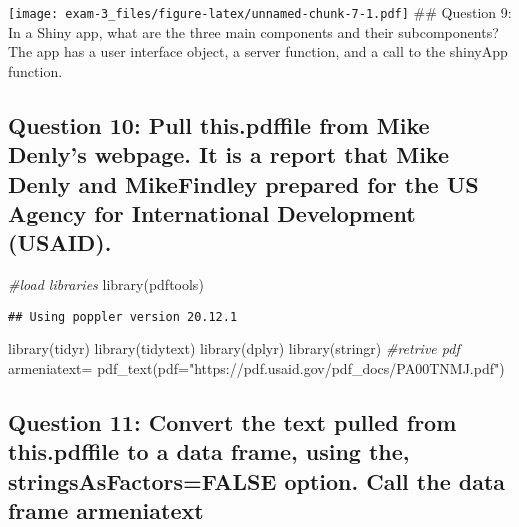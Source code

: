\documentclass[
]{article}
\newenvironment{Shaded}{\begin{snugshade}}{\end{snugshade}}
\newcommand{\AttributeTok}[1]{\textcolor[rgb]{0.77,0.63,0.00}{#1}}
\newcommand{\CommentTok}[1]{\textcolor[rgb]{0.56,0.35,0.01}{\textit{#1}}}
\newcommand{\FunctionTok}[1]{\textcolor[rgb]{0.00,0.00,0.00}{#1}}
\newcommand{\NormalTok}[1]{#1}
\newcommand{\OtherTok}[1]{\textcolor[rgb]{0.56,0.35,0.01}{#1}}
\newcommand{\StringTok}[1]{\textcolor[rgb]{0.31,0.60,0.02}{#1}}
\begin{document}
\texttt{[image: exam-3\_files/figure-latex/unnamed-chunk-7-1.pdf]} \#\#
Question 9: In a Shiny app, what are the three main components and their
subcomponents? The app has a user interface object, a server function,
and a call to the shinyApp function.

\hypertarget{question-10-pull-this.pdffile-from-mike-denlys-webpage.-it-is-a-report-that-mike-denly-and-mikefindley-prepared-for-the-us-agency-for-international-development-usaid.}{%
\subsection{Question 10: Pull this.pdffile from Mike Denly's webpage. It
is a report that Mike Denly and MikeFindley prepared for the US Agency
for International Development
(USAID).}\label{question-10-pull-this.pdffile-from-mike-denlys-webpage.-it-is-a-report-that-mike-denly-and-mikefindley-prepared-for-the-us-agency-for-international-development-usaid.}}

\begin{Shaded}
\begin{Highlighting}[]
\CommentTok{\#load libraries}
\FunctionTok{library}\NormalTok{(pdftools)}
\end{Highlighting}
\end{Shaded}

\begin{verbatim}
## Using poppler version 20.12.1
\end{verbatim}

\begin{Shaded}
\begin{Highlighting}[]
\FunctionTok{library}\NormalTok{(tidyr)}
\FunctionTok{library}\NormalTok{(tidytext)}
\FunctionTok{library}\NormalTok{(dplyr)}
\FunctionTok{library}\NormalTok{(stringr)}
\CommentTok{\#retrive pdf}
\NormalTok{armeniatext}\OtherTok{=} \FunctionTok{pdf\_text}\NormalTok{(}\AttributeTok{pdf=}\StringTok{"https://pdf.usaid.gov/pdf\_docs/PA00TNMJ.pdf"}\NormalTok{)}
\end{Highlighting}
\end{Shaded}

\hypertarget{question-11-convert-the-text-pulled-from-this.pdffile-to-a-data-frame-using-the-stringsasfactorsfalse-option.-call-the-data-frame-armeniatext}{%
\subsection{Question 11: Convert the text pulled from this.pdffile to a
data frame, using the, stringsAsFactors=FALSE option. Call the data
frame
armeniatext}\label{question-11-convert-the-text-pulled-from-this.pdffile-to-a-data-frame-using-the-stringsasfactorsfalse-option.-call-the-data-frame-armeniatext}}
\end{document}
